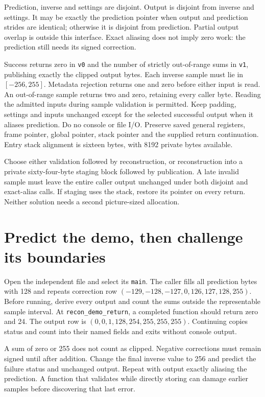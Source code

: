 Prediction, inverse and settings are disjoint. Output is disjoint from inverse
and settings. It may be exactly the prediction pointer when output and prediction
strides are identical; otherwise it is disjoint from prediction. Partial output
overlap is outside this interface. Exact aliasing does not imply zero work:
the prediction still needs its signed correction.

Success returns zero in \texttt{v0} and the number of strictly out-of-range sums
in \texttt{v1}, publishing exactly the clipped output bytes. Each inverse sample
must lie in $[-256,255]$. Metadata rejection returns one and zero before either
input is read. An out-of-range sample returns two and zero, retaining every
caller byte. Reading the admitted inputs during sample validation is permitted.
Keep padding, settings and inputs unchanged except for the selected successful
output when it aliases prediction. Do no console or file I/O. Preserve saved
general registers, frame pointer, global pointer, stack pointer and the supplied
return continuation. Entry stack alignment is sixteen bytes, with 8192 private
bytes available.

Choose either validation followed by reconstruction, or reconstruction into a
private sixty-four-byte staging block followed by publication. A late invalid
sample must leave the entire caller output unchanged under both disjoint and
exact-alias calls. If staging uses the stack, restore its pointer on every return.
Neither solution needs a second picture-sized allocation.

\section{Predict the demo, then challenge its boundaries}

Open the independent file and select its \texttt{main}. The caller fills all
prediction bytes with 128 and repeats correction row
$(-129,-128,-127,0,126,127,128,255)$. Before running, derive every output and
count the sums outside the representable sample interval. At
\texttt{recon\_demo\_return}, a completed function should return zero and 24.
The output row is $(0,0,1,128,254,255,255,255)$. Continuing copies status and
count into their named fields and exits without console output.

A sum of zero or 255 does not count as clipped. Negative corrections must remain
signed until after addition. Change the final inverse value to 256 and predict
the failure status and unchanged output. Repeat with output exactly aliasing the
prediction. A function that validates while directly storing can damage earlier
samples before discovering that last error.

